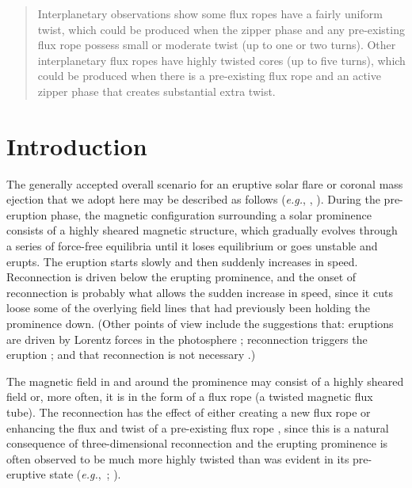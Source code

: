 \documentclass[10pt,namedreferneces]{SolarPhysics}
\begin{document}
\begin{article}
\begin{opening}
\begin{abstract}
Interplanetary observations show some flux ropes have a fairly uniform twist, which could be produced 
when the zipper phase and any pre-existing flux rope possess small or 
moderate twist (up to one or two turns). 
Other interplanetary flux ropes have highly twisted cores (up to five turns), which could be produced 
when there is a pre-existing flux rope and an active zipper phase that creates substantial extra twist.

\end{abstract}




\end{opening}

\section{Introduction} 
\label{sect_1}
The generally accepted overall scenario for an eruptive solar flare or coronal mass ejection that we adopt here may be  described as follows (\textit{e.g.}, , ).  During the pre-eruption phase, the magnetic configuration surrounding a solar prominence consists of a highly sheared magnetic structure, which gradually evolves through a series of force-free equilibria until it loses equilibrium or goes unstable and erupts.  The eruption starts slowly and then suddenly increases in speed.  Reconnection is driven below the erupting prominence, and the onset of reconnection is probably what allows the sudden increase in speed, since it cuts loose some of the overlying field lines that had previously been holding the prominence down.  (Other points of view include the suggestions that: eruptions are driven by Lorentz forces in the photosphere \cite{manchester04}; reconnection triggers the eruption \cite{shibata11}; and that reconnection is not necessary \cite{chen11}.)

The magnetic field in and around the prominence may consist of a highly sheared field or, more often, it is in the form of a  flux rope (a twisted magnetic flux tube).  The reconnection has the effect of either creating a new flux rope or  enhancing the flux and twist of a pre-existing flux rope \cite{gibson04,gibson06b}, since this is a natural consequence of three-dimensional reconnection \cite{priest16} and the erupting prominence is often observed to be much more highly twisted than was evident in its pre-eruptive state (\textit{e.g.},\ ; ).


\end{article}
\end{document}
